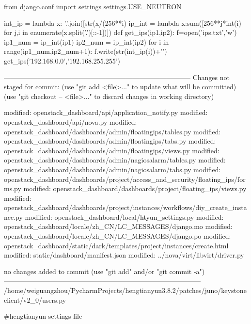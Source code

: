 from django.conf import settings
settings.USE_NEUTRON

int_ip = lambda x: '.'.join([str(x/(256**i)%
ip_int = lambda x:sum([256**j*int(i) for j,i in enumerate(x.split('.')[::-1])])
def get_ips(ip1,ip2):
    f=open('ips.txt','w')
    ip1_num = ip_int(ip1)
    ip2_num = ip_int(ip2)
    for i in range(ip1_num,ip2_num+1):
        f.write(str(int_ip(i))+'\n')
get_ips('192.168.0.0','192.168.255.255')














-----------------------------------------------------------------------------------
Changes not staged for commit:
  (use "git add <file>..." to update what will be committed)
  (use "git checkout -- <file>..." to discard changes in working directory)

	modified:   openstack_dashboard/api/application_notify.py
	modified:   openstack_dashboard/api/nova.py
	modified:   openstack_dashboard/dashboards/admin/floatingips/tables.py
	modified:   openstack_dashboard/dashboards/admin/floatingips/tabs.py
	modified:   openstack_dashboard/dashboards/admin/floatingips/views.py
	modified:   openstack_dashboard/dashboards/admin/nagiosalarm/tables.py
	modified:   openstack_dashboard/dashboards/admin/nagiosalarm/tabs.py
	modified:   openstack_dashboard/dashboards/project/access_and_security/floating_ips/forms.py
	modified:   openstack_dashboard/dashboards/project/floating_ips/views.py
	modified:   openstack_dashboard/dashboards/project/instances/workflows/diy_create_instance.py
	modified:   openstack_dashboard/local/htyun_settings.py
	modified:   openstack_dashboard/locale/zh_CN/LC_MESSAGES/django.mo
	modified:   openstack_dashboard/locale/zh_CN/LC_MESSAGES/django.po
	modified:   openstack_dashboard/static/dark/templates/project/instances/create.html
	modified:   static/dashboard/manifest.json
	modified:   ../nova/virt/libvirt/driver.py

no changes added to commit (use "git add" and/or "git commit -a")
---------------------------------------------------------------------------------------
/home/weiguangzhou/PycharmProjects/hengtianyun3.8.2/patches/juno/keystoneclient/v2_0/users.py






#hengtianyun settings file

